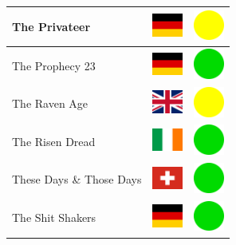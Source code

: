 \documentclass[12pt, a4paper, twoside]{report}
\begin{document}
\begin{center}
\begin{longtable}{|p{5cm}|p{2cm}|p{2cm}|}
 The Privateer                                              & \includegraphics[width=1cm]{../4x3/de} &   \includegraphics[width=1cm]{../likes/m} \\ \hline
 The Prophecy 23                                            & \includegraphics[width=1cm]{../4x3/de} &   \includegraphics[width=1cm]{../likes/y} \\ \hline
 The Raven Age                                              & \includegraphics[width=1cm]{../4x3/gb} &   \includegraphics[width=1cm]{../likes/m} \\ \hline
 The Risen Dread                                            & \includegraphics[width=1cm]{../4x3/ie} &   \includegraphics[width=1cm]{../likes/y} \\ \hline
 These Days \& Those Days                                   & \includegraphics[width=1cm]{../4x3/ch} &   \includegraphics[width=1cm]{../likes/y} \\ \hline
 The Shit Shakers                                           & \includegraphics[width=1cm]{../4x3/de} &   \includegraphics[width=1cm]{../likes/y} \\ \hline

\end{longtable}
\end{center}
\end{document}
